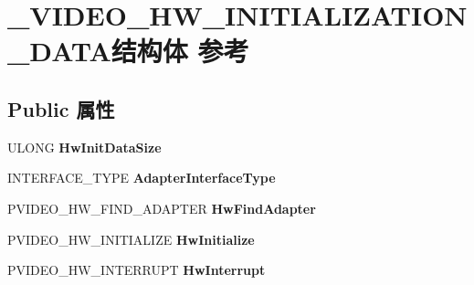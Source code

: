 \hypertarget{struct___v_i_d_e_o___h_w___i_n_i_t_i_a_l_i_z_a_t_i_o_n___d_a_t_a}{}\section{\+\_\+\+V\+I\+D\+E\+O\+\_\+\+H\+W\+\_\+\+I\+N\+I\+T\+I\+A\+L\+I\+Z\+A\+T\+I\+O\+N\+\_\+\+D\+A\+T\+A结构体 参考}
\label{struct___v_i_d_e_o___h_w___i_n_i_t_i_a_l_i_z_a_t_i_o_n___d_a_t_a}
\subsection*{Public 属性}
\begin{DoxyCompactItemize}
\item 
\mbox{\label{struct___v_i_d_e_o___h_w___i_n_i_t_i_a_l_i_z_a_t_i_o_n___d_a_t_a_a5f03083d9cb84b5ce8ef8d294218c192}} 
U\+L\+O\+NG {\bfseries Hw\+Init\+Data\+Size}
\item 
\mbox{\label{struct___v_i_d_e_o___h_w___i_n_i_t_i_a_l_i_z_a_t_i_o_n___d_a_t_a_aa64944750727c2bfe47a26ddecaf94e8}} 
I\+N\+T\+E\+R\+F\+A\+C\+E\+\_\+\+T\+Y\+PE {\bfseries Adapter\+Interface\+Type}
\item 
\mbox{\label{struct___v_i_d_e_o___h_w___i_n_i_t_i_a_l_i_z_a_t_i_o_n___d_a_t_a_a0c91cd2d3806a949914d7aafe57b6620}} 
P\+V\+I\+D\+E\+O\+\_\+\+H\+W\+\_\+\+F\+I\+N\+D\+\_\+\+A\+D\+A\+P\+T\+ER {\bfseries Hw\+Find\+Adapter}
\item 
\mbox{\label{struct___v_i_d_e_o___h_w___i_n_i_t_i_a_l_i_z_a_t_i_o_n___d_a_t_a_ac86b4cdd18d991698667218a0bd127e8}} 
P\+V\+I\+D\+E\+O\+\_\+\+H\+W\+\_\+\+I\+N\+I\+T\+I\+A\+L\+I\+ZE {\bfseries Hw\+Initialize}
\item 
\mbox{\label{struct___v_i_d_e_o___h_w___i_n_i_t_i_a_l_i_z_a_t_i_o_n___d_a_t_a_a6f44d5c2bdf0cf0d1e4ff9723c8bda47}} 
P\+V\+I\+D\+E\+O\+\_\+\+H\+W\+\_\+\+I\+N\+T\+E\+R\+R\+U\+PT {\bfseries Hw\+Interrupt}

\end{DoxyCompactItemize}
